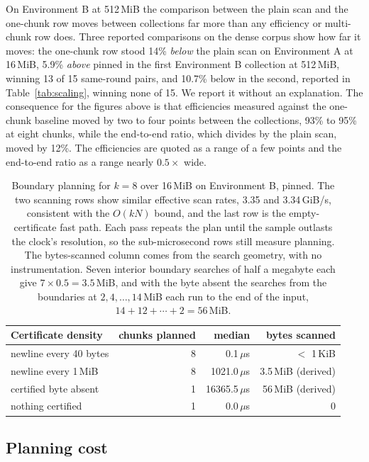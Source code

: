 \documentclass[11pt,a4paper]{article}
\theoremstyle{definition}
\theoremstyle{plain}
\begin{document}
On Environment B at 512\,MiB the comparison between the plain scan and the one-chunk row moves between collections far
more than any efficiency or multi-chunk row does. Three reported comparisons on the dense corpus show how far it moves:
the one-chunk row stood 14\% \emph{below} the plain scan on Environment A at 16\,MiB, 5.9\% \emph{above} pinned in the
first Environment B collection at 512\,MiB, winning 13 of 15 same-round pairs, and 10.7\% below in the second, reported
in Table~\ref{tab:scaling}, winning none of 15. We report it without an explanation. The consequence for the figures
above is that efficiencies measured against the one-chunk baseline moved by two to four points between the collections,
93\% to 95\% at eight chunks, while the end-to-end ratio, which divides by the plain scan, moved by 12\%. The
efficiencies are quoted as a range of a few points and the end-to-end ratio as a range nearly $0.5\times$ wide.

\begin{table}[t]
\centering
\begin{tabular}{lrrr}
\toprule
Certificate density & chunks planned & median & bytes scanned \\
\midrule
newline every 40 bytes    & 8 & 0.1\,$\mu$s     & $<$ 1\,KiB \\
newline every 1\,MiB      & 8 & 1021.0\,$\mu$s  & 3.5\,MiB (derived) \\
certified byte absent     & 1 & 16365.5\,$\mu$s & 56\,MiB (derived) \\
nothing certified         & 1 & 0.0\,$\mu$s     & 0 \\
\bottomrule
\end{tabular}
\caption{Boundary planning for $k=8$ over 16\,MiB on Environment B, pinned. The two scanning rows show similar effective
scan rates, 3.35 and 3.34\,GiB/s, consistent with the $O(kN)$ bound, and the last row is the empty-certificate fast
path. Each pass repeats the plan until the sample outlasts the clock's resolution, so the sub-microsecond rows still
measure planning. The bytes-scanned column comes from the search geometry, with no instrumentation. Seven interior
boundary searches of half a megabyte each give $7 \times 0.5 = 3.5$\,MiB, and with the byte absent the searches from the
boundaries at $2, 4, \ldots, 14$\,MiB each run to the end of the input, $14 + 12 + \cdots + 2 = 56$\,MiB.}
\label{tab:planning}
\end{table}

\subsection{Planning cost}
\label{sec:planning}
\end{document}
